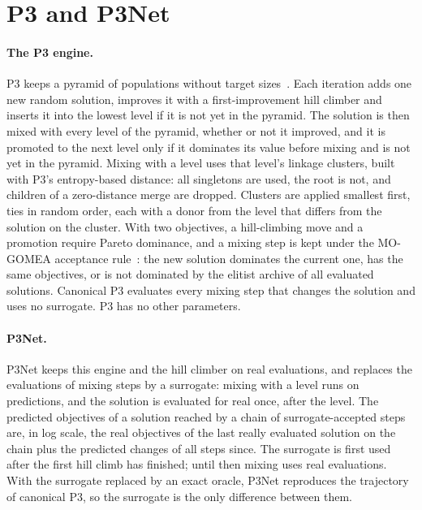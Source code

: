 \section{P3 and P3Net}
\label{sec:proposed-optimizer}

\paragraph{The P3 engine.} P3 keeps a pyramid of populations without target sizes~\citep{goldman2014parameterless}.
Each iteration adds one new random solution, improves it with a first-improvement hill climber and inserts it into the
lowest level if it is not yet in the pyramid. The solution is then mixed with every level of the pyramid, whether or not
it improved, and it is promoted to the next level only if it dominates its value before mixing and is not yet in the
pyramid. Mixing with a level uses that level's linkage clusters, built with P3's entropy-based distance: all
singletons are used, the root is not, and children of a zero-distance merge are dropped. Clusters are applied smallest
first, ties in random order, each with a donor from the level that differs from the solution on the cluster. With two
objectives, a hill-climbing move and a promotion require Pareto dominance, and a mixing step is kept under the
MO-GOMEA acceptance rule~\citep{luong2014mogomea}: the new solution dominates the current one, has the same
objectives, or is not dominated by the elitist archive of all evaluated solutions. Canonical P3 evaluates every mixing
step that changes the solution and uses no surrogate. P3 has no other parameters.

\paragraph{P3Net.} P3Net keeps this engine and the hill climber on real evaluations, and replaces the evaluations
of mixing steps by a surrogate: mixing with a level runs on predictions, and the solution is evaluated for real once,
after the level. The predicted objectives of a solution reached by a chain of surrogate-accepted steps are, in log
scale, the real objectives of the last really evaluated solution on the chain plus the predicted changes of all steps
since. The surrogate is first
used after the first hill climb has finished; until then mixing uses real evaluations. With the surrogate replaced by
an exact oracle, P3Net reproduces the trajectory of canonical P3, so the surrogate is the only difference between them.

